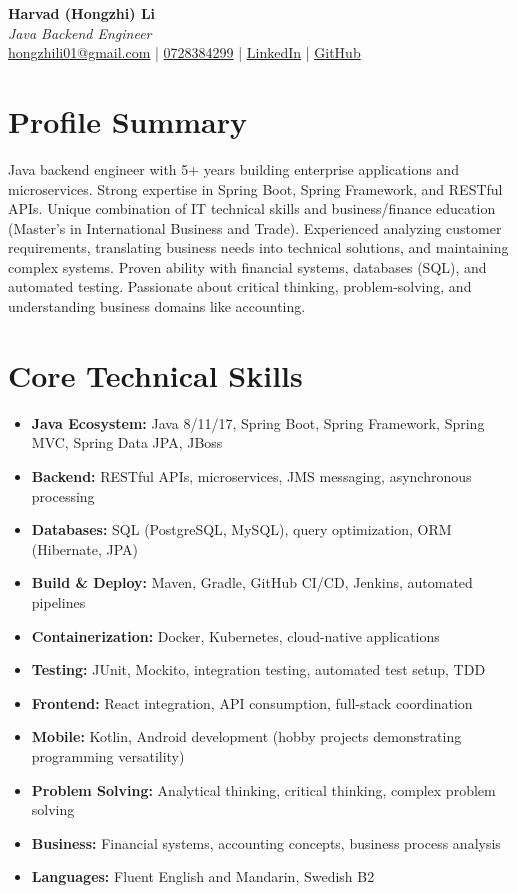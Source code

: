 \documentclass[10pt,a4paper]{article}
\begin{document}
\pagestyle{empty}

\begin{center}
{\LARGE \textbf{Harvad (Hongzhi) Li}}\\[10pt]
{\Large \textit{Java Backend Engineer}}\\[10pt]
\textcolor{linkedinblue}{\href{mailto:hongzhili01@gmail.com}{hongzhili01@gmail.com} | \href{tel:0728384299}{0728384299} | \href{https://www.linkedin.com/in/harvad/}{LinkedIn} | \href{https://github.com/bluehawana}{GitHub}}
\end{center}

\section*{Profile Summary}
Java backend engineer with 5+ years building enterprise applications and microservices. Strong expertise in Spring Boot, Spring Framework, and RESTful APIs. Unique combination of IT technical skills and business/finance education (Master's in International Business and Trade). Experienced analyzing customer requirements, translating business needs into technical solutions, and maintaining complex systems. Proven ability with financial systems, databases (SQL), and automated testing. Passionate about critical thinking, problem-solving, and understanding business domains like accounting.

\section*{Core Technical Skills}
\begin{itemize}[noitemsep]
\item \textbf{Java Ecosystem:} Java 8/11/17, Spring Boot, Spring Framework, Spring MVC, Spring Data JPA, JBoss
\item \textbf{Backend:} RESTful APIs, microservices, JMS messaging, asynchronous processing
\item \textbf{Databases:} SQL (PostgreSQL, MySQL), query optimization, ORM (Hibernate, JPA)
\item \textbf{Build \& Deploy:} Maven, Gradle, GitHub CI/CD, Jenkins, automated pipelines
\item \textbf{Containerization:} Docker, Kubernetes, cloud-native applications
\item \textbf{Testing:} JUnit, Mockito, integration testing, automated test setup, TDD
\item \textbf{Frontend:} React integration, API consumption, full-stack coordination
\item \textbf{Mobile:} Kotlin, Android development (hobby projects demonstrating programming versatility)
\item \textbf{Problem Solving:} Analytical thinking, critical thinking, complex problem solving
\item \textbf{Business:} Financial systems, accounting concepts, business process analysis
\item \textbf{Languages:} Fluent English and Mandarin, Swedish B2
\end{itemize}
\end{document}
